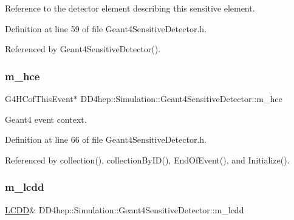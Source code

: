 Reference to the detector element describing this sensitive element. 



Definition at line 59 of file Geant4\+Sensitive\+Detector.\+h.



Referenced by Geant4\+Sensitive\+Detector().

\hypertarget{class_d_d4hep_1_1_simulation_1_1_geant4_sensitive_detector_abba73e5c3e4dfb26cc46bb5c165cf225}{}\label{class_d_d4hep_1_1_simulation_1_1_geant4_sensitive_detector_abba73e5c3e4dfb26cc46bb5c165cf225} 
\subsubsection{\texorpdfstring{m\+\_\+hce}{m\_hce}}
{\footnotesize\ttfamily G4\+H\+Cof\+This\+Event$\ast$ D\+D4hep\+::\+Simulation\+::\+Geant4\+Sensitive\+Detector\+::m\+\_\+hce\hspace{0.3cm}{\ttfamily [protected]}}



Geant4 event context. 



Definition at line 66 of file Geant4\+Sensitive\+Detector.\+h.



Referenced by collection(), collection\+By\+I\+D(), End\+Of\+Event(), and Initialize().

\hypertarget{class_d_d4hep_1_1_simulation_1_1_geant4_sensitive_detector_af2c638cb0b0a50437852cf6fb57ef7f1}{}\label{class_d_d4hep_1_1_simulation_1_1_geant4_sensitive_detector_af2c638cb0b0a50437852cf6fb57ef7f1} 
\subsubsection{\texorpdfstring{m\+\_\+lcdd}{m\_lcdd}}
{\footnotesize\ttfamily \hyperlink{class_d_d4hep_1_1_geometry_1_1_l_c_d_d}{L\+C\+DD}\& D\+D4hep\+::\+Simulation\+::\+Geant4\+Sensitive\+Detector\+::m\+\_\+lcdd\hspace{0.3cm}{\ttfamily [protected]}}



